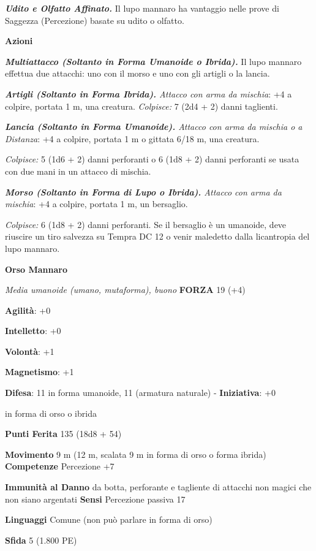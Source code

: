 \begin{multicols}{2}
\emph{\textbf{Udito e Olfatto Affinato.}} Il lupo mannaro ha vantaggio
nelle prove di Saggezza (Percezione) basate su udito o olfatto.

\smallskip\textbf{Azioni}

\emph{\textbf{Multiattacco (Soltanto in Forma Umanoide o Ibrida).}} Il
lupo mannaro effettua due attacchi: uno con il morso e uno con gli
artigli o la lancia.

\emph{\textbf{Artigli (Soltanto in Forma Ibrida).} Attacco con arma da
mischia}: +4 a colpire, portata 1 m, una creatura. \emph{Colpisce:} 7
(2d4 + 2) danni taglienti.

\emph{\textbf{Lancia (Soltanto in Forma Umanoide).} Attacco con arma da
mischia o a Distanza}: +4 a colpire, portata 1 m o gittata 6/18 m, una
creatura.

\emph{Colpisce:} 5 (1d6 + 2) danni perforanti o 6 (1d8 + 2) danni
perforanti se usata con due mani in un attacco di mischia.

\emph{\textbf{Morso (Soltanto in Forma di Lupo o Ibrida).} Attacco con
arma da mischia}: +4 a colpire, portata 1 m, un bersaglio.

\emph{Colpisce:} 6 (1d8 + 2) danni perforanti. Se il bersaglio è un
umanoide, deve riuscire un tiro salvezza su Tempra DC 12 o venir
maledetto dalla licantropia del lupo mannaro.

\textbf{Orso Mannaro}

\emph{Media umanoide (umano, mutaforma), buono} \textbf{FORZA}
19 (+4)

\textbf{Agilità}: +0

\textbf{Intelletto}: +0

\textbf{Volontà}: +1

\textbf{Magnetismo}: +1

\textbf{Difesa}: 11 in forma umanoide, 11 (armatura naturale) - \textbf{Iniziativa}: +0

in forma di orso o ibrida

\textbf{Punti Ferita} 135 (18d8 + 54)

\textbf{Movimento} 9 m (12 m, scalata 9 m in forma di orso o forma
ibrida) \textbf{Competenze} Percezione +7

\textbf{Immunità al Danno} da botta, perforante e tagliente di
attacchi non magici che non siano argentati \textbf{Sensi} Percezione
passiva 17

\textbf{Linguaggi} Comune (non può parlare in forma di orso)

\textbf{Sfida} 5 (1.800 PE)\smallskip


\end{multicols}
